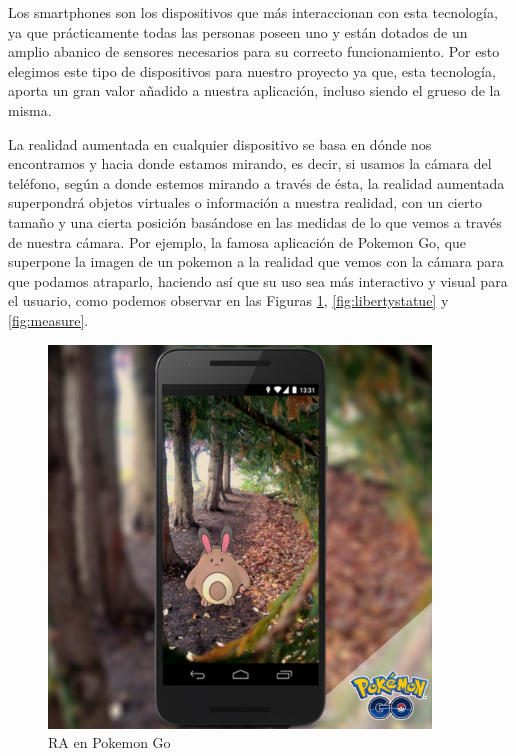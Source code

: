 Los smartphones son los dispositivos que más interaccionan con esta tecnología, ya que prácticamente todas las personas poseen uno
 y están dotados de un amplio abanico de sensores necesarios para su correcto funcionamiento. Por esto elegimos este tipo de dispositivos para nuestro
 proyecto ya que, esta tecnología, aporta un gran valor añadido a nuestra aplicación, incluso siendo el grueso de la misma. 

 La realidad aumentada en cualquier dispositivo se basa en dónde nos encontramos y hacia donde estamos mirando, es decir, si usamos la cámara del teléfono,
 según a donde estemos mirando a través de ésta, la realidad aumentada superpondrá objetos virtuales o información a nuestra realidad, con un cierto tamaño y una cierta posición
 basándose en las medidas de lo que vemos a través de nuestra cámara. Por ejemplo, la famosa aplicación de Pokemon Go, que superpone la imagen de un pokemon a la realidad
 que vemos con la cámara para que podamos atraparlo, haciendo así que su uso sea más interactivo y visual para el usuario, como podemos observar en las Figuras \ref{fig:pokemon}, \ref{fig:libertystatue} y \ref{fig:measure}.

 \begin{figure}[H]
    \centering
    \includegraphics[width=4in]{figures/chapter-2/pokemongo.png}
    \caption{RA en Pokemon Go}
    \label{fig:pokemon}
\end{figure}

